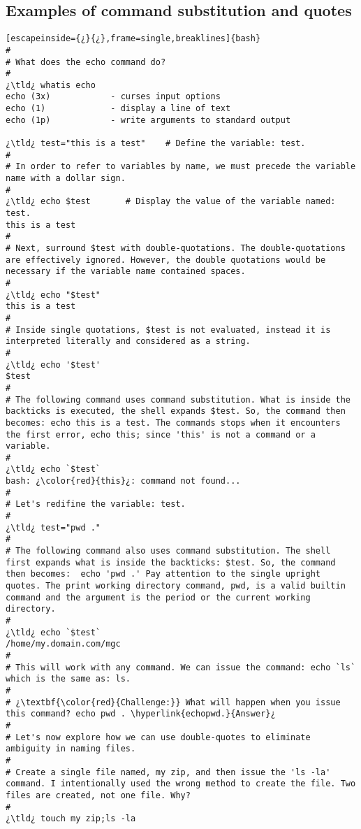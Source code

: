 
\subsection{Examples of command substitution and quotes}

\begin{lstlisting}[escapeinside={¿}{¿},frame=single,breaklines]{bash}
#
# What does the echo command do?
#
¿\tld¿ whatis echo
echo (3x)            - curses input options
echo (1)             - display a line of text
echo (1p)            - write arguments to standard output

¿\tld¿ test="this is a test"	# Define the variable: test.
#
# In order to refer to variables by name, we must precede the variable name with a dollar sign.
#
¿\tld¿ echo $test		# Display the value of the variable named: test.
this is a test
#
# Next, surround $test with double-quotations. The double-quotations are effectively ignored. However, the double quotations would be necessary if the variable name contained spaces.
#
¿\tld¿ echo "$test"
this is a test
#
# Inside single quotations, $test is not evaluated, instead it is interpreted literally and considered as a string.
#
¿\tld¿ echo '$test'
$test
#
# The following command uses command substitution. What is inside the backticks is executed, the shell expands $test. So, the command then becomes: echo this is a test. The commands stops when it encounters the first error, echo this; since 'this' is not a command or a variable.
#
¿\tld¿ echo `$test`	
bash: ¿\color{red}{this}¿: command not found...
#
# Let's redifine the variable: test.
#
¿\tld¿ test="pwd ."
#
# The following command also uses command substitution. The shell first expands what is inside the backticks: $test. So, the command then becomes:  echo 'pwd .' Pay attention to the single upright quotes. The print working directory command, pwd, is a valid builtin command and the argument is the period or the current working directory. 
#
¿\tld¿ echo `$test`	
/home/my.domain.com/mgc
#
# This will work with any command. We can issue the command: echo `ls` which is the same as: ls.
# 
# ¿\textbf{\color{red}{Challenge:}} What will happen when you issue this command? echo pwd . \hyperlink{echopwd.}{Answer}¿  
#
# Let's now explore how we can use double-quotes to eliminate ambiguity in naming files.
#
# Create a single file named, my zip, and then issue the 'ls -la' command. I intentionally used the wrong method to create the file. Two files are created, not one file. Why?
#
¿\tld¿ touch my zip;ls -la

\end{lstlisting}
